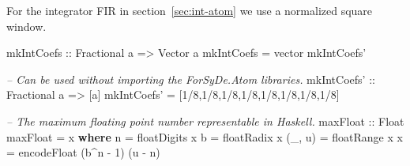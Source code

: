 \documentclass[
  a4paper,
]{article}
\newenvironment{Shaded}{}{}
\newcommand{\CommentTok}[1]{\textcolor[rgb]{0.38,0.63,0.69}{\textit{#1}}}
\newcommand{\DataTypeTok}[1]{\textcolor[rgb]{0.56,0.13,0.00}{#1}}
\newcommand{\DecValTok}[1]{\textcolor[rgb]{0.25,0.63,0.44}{#1}}
\newcommand{\FunctionTok}[1]{\textcolor[rgb]{0.02,0.16,0.49}{#1}}
\newcommand{\KeywordTok}[1]{\textcolor[rgb]{0.00,0.44,0.13}{\textbf{#1}}}
\newcommand{\NormalTok}[1]{#1}
\newcommand{\OtherTok}[1]{\textcolor[rgb]{0.00,0.44,0.13}{#1}}
\begin{document}
\begin{Shaded}
\end{Shaded}

For the integrator FIR in section~\ref{sec:int-atom} we use a normalized
square window.

\begin{Shaded}
\begin{Highlighting}[numbers=left,,firstnumber=97,]
\OtherTok{mkIntCoefs ::} \DataTypeTok{Fractional}\NormalTok{ a }\OtherTok{=>} \DataTypeTok{Vector}\NormalTok{ a}
\NormalTok{mkIntCoefs }\FunctionTok{=}\NormalTok{ vector mkIntCoefs'}
\end{Highlighting}
\end{Shaded}

\begin{Shaded}
\begin{Highlighting}[numbers=left,,firstnumber=100,]
\CommentTok{-- Can be used without importing the ForSyDe.Atom libraries.}
\OtherTok{mkIntCoefs' ::} \DataTypeTok{Fractional}\NormalTok{ a }\OtherTok{=>}\NormalTok{ [a]}
\NormalTok{mkIntCoefs' }\FunctionTok{=}\NormalTok{ [}\DecValTok{1}\FunctionTok{/}\DecValTok{8}\NormalTok{,}\DecValTok{1}\FunctionTok{/}\DecValTok{8}\NormalTok{,}\DecValTok{1}\FunctionTok{/}\DecValTok{8}\NormalTok{,}\DecValTok{1}\FunctionTok{/}\DecValTok{8}\NormalTok{,}\DecValTok{1}\FunctionTok{/}\DecValTok{8}\NormalTok{,}\DecValTok{1}\FunctionTok{/}\DecValTok{8}\NormalTok{,}\DecValTok{1}\FunctionTok{/}\DecValTok{8}\NormalTok{,}\DecValTok{1}\FunctionTok{/}\DecValTok{8}\NormalTok{] }
\end{Highlighting}
\end{Shaded}

\begin{Shaded}
\begin{Highlighting}[numbers=left,,firstnumber=104,]
\CommentTok{-- The maximum floating point number representable in Haskell. }
\OtherTok{maxFloat ::} \DataTypeTok{Float}
\NormalTok{maxFloat }\FunctionTok{=}\NormalTok{ x}
 \KeywordTok{where}\NormalTok{ n }\FunctionTok{=} \FunctionTok{floatDigits}\NormalTok{ x}
\NormalTok{       b }\FunctionTok{=} \FunctionTok{floatRadix}\NormalTok{ x}
\NormalTok{       (_, u) }\FunctionTok{=} \FunctionTok{floatRange}\NormalTok{ x}
\NormalTok{       x }\FunctionTok{=} \FunctionTok{encodeFloat}\NormalTok{ (b}\FunctionTok{^}\NormalTok{n }\FunctionTok{-} \DecValTok{1}\NormalTok{) (u }\FunctionTok{-}\NormalTok{ n)}
\end{Highlighting}
\end{Shaded}
\end{document}
